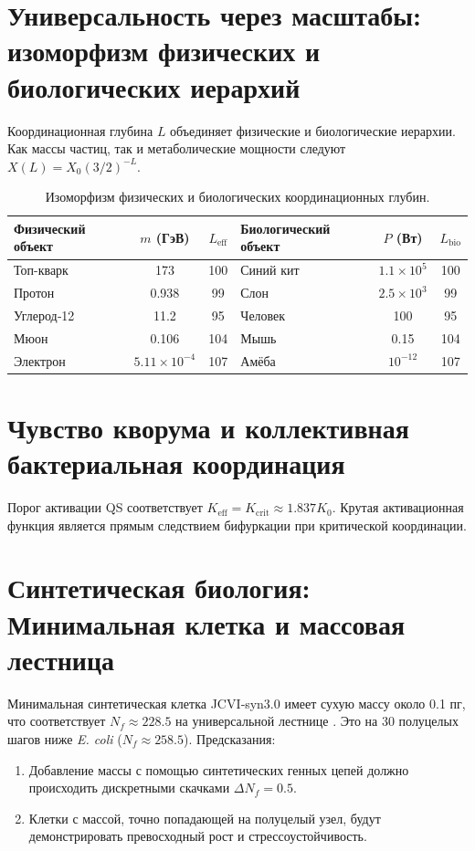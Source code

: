 \documentclass[11pt,a4paper]{article}
\begin{document}
	\section{Универсальность через масштабы: изоморфизм физических и биологических иерархий}
	\label{sec:isomorphism}
	
	Координационная глубина \(L\) объединяет физические и биологические иерархии. Как массы частиц, так и метаболические мощности следуют \(X(L) = X_0 (3/2)^{-L}\).
	
	\begin{table}[H]
		\centering
		\caption{Изоморфизм физических и биологических координационных глубин.}
		\label{tab:isomorphism}
		\begin{tabular}{l c c l c c}
			\toprule
			\textbf{Физический объект} & \(m\) (ГэВ) & \(L_{\mathrm{eff}}\) & \textbf{Биологический объект} & \(P\) (Вт) & \(L_{\mathrm{bio}}\) \\
			\midrule
			Топ-кварк & 173 & 100 & Синий кит & \(1.1\times10^5\) & 100 \\
			Протон & 0.938 & 99 & Слон & \(2.5\times10^3\) & 99 \\
			Углерод‑12 & 11.2 & 95 & Человек & 100 & 95 \\
			Мюон & 0.106 & 104 & Мышь & 0.15 & 104 \\
			Электрон & \(5.11\times10^{-4}\) & 107 & Амёба & \(10^{-12}\) & 107 \\
			\bottomrule
		\end{tabular}
	\end{table}
	
	\section{Чувство кворума и коллективная бактериальная координация}
	
	Порог активации QS соответствует \(K_{\text{eff}} = K_{\mathrm{crit}} \approx 1.837 K_0\). Крутая активационная функция является прямым следствием бифуркации при критической координации.
	
	\section{Синтетическая биология: Минимальная клетка и массовая лестница}
	
	Минимальная синтетическая клетка JCVI‑syn3.0 имеет сухую массу около 0.1 пг, что соответствует \(N_f \approx 228.5\) на универсальной лестнице \cite{Hutchison2016, Pelletier2023}. Это на 30 полуцелых шагов ниже \textit{E. coli} (\(N_f \approx 258.5\)). Предсказания:
	\begin{enumerate}
		\item Добавление массы с помощью синтетических генных цепей должно происходить дискретными скачками \(\Delta N_f = 0.5\).
		\item Клетки с массой, точно попадающей на полуцелый узел, будут демонстрировать превосходный рост и стрессоустойчивость.
	\end{enumerate}
	
\end{document}
